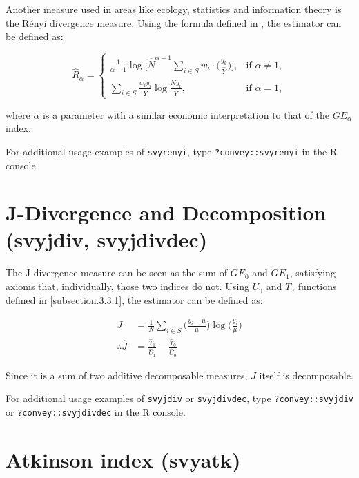 \documentclass[]{book}
\begin{document}
Another measure used in areas like ecology, statistics and information
theory is the Rényi divergence measure. Using the formula defined in
\citet{langel2012}, the estimator can be defined as:

\[
\widehat{R}_\alpha =
\begin{cases}
\frac{1}{\alpha - 1} \log \bigg[ \widehat{N}^{\alpha - 1} \sum_{i \in S} w_i \cdot \bigg( \frac{y_k}{ \widehat{Y} } \bigg) \bigg], &\text{if } \alpha \neq 1, \\
\sum_{i \in S} \frac{w_i y_i}{ \widehat{Y}} \log \frac{\widehat{N} y_i}{\widehat{Y}}, &\text{if } \alpha = 1,
\end{cases}
\]

where \(\alpha\) is a parameter with a similar economic interpretation
to that of the \(GE_\alpha\) index.

For additional usage examples of \texttt{svyrenyi}, type
\texttt{?convey::svyrenyi} in the R console.

\section{J-Divergence and Decomposition (svyjdiv,
svyjdivdec)}\label{j-divergence-and-decomposition-svyjdiv-svyjdivdec}

The J-divergence measure \citep{rohde2016} can be seen as the sum of
\(GE_0\) and \(GE_1\), satisfying axioms that, individually, those two
indices do not. Using \(U_\gamma\) and \(T_\gamma\) functions defined in
\ref{subsection.3.3.1}, the estimator can be defined as:

\[
\begin{aligned}
J &= \frac{1}{N} \sum_{i \in S} \bigg( \frac{ y_i - \mu }{ \mu } \bigg) \log \bigg( \frac{y_i}{\mu} \bigg) \\
\therefore \widehat{J} &= \frac{\widehat{T}_1}{\widehat{U}_1} - \frac{ \widehat{T}_0 }{ \widehat{U}_0 }
\end{aligned}
\]

Since it is a sum of two additive decomposable measures, \(J\) itself is
decomposable.

For additional usage examples of \texttt{svyjdiv} or
\texttt{svyjdivdec}, type \texttt{?convey::svyjdiv} or
\texttt{?convey::svyjdivdec} in the R console.

\section{Atkinson index (svyatk)}\label{atkinson-index-svyatk}
\end{document}
